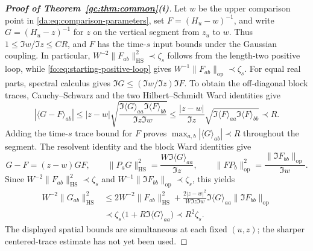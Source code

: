 \documentclass[11pt]{article}
\numberwithin{equation}{section}
\theoremstyle{remark}
\newcommand{\op}{\mathrm{op}}
\newcommand{\HS}{\mathrm{HS}}
\begin{document}
\begin{proof}[\textbf{Proof of Theorem~\ref{gc:thm:common}(i)}]
Let $w$ be the upper comparison point in \eqref{da:eq:comparison-parameters},
set $F=(H_u-w)^{-1}$, and write $G=(H_u-z)^{-1}$ for $z$ on the
vertical segment from $z_u$ to $w$. Thus
$1\le\Im w/\Im z\le CR$, and $F$ has the time-$s$ input bounds
under the Gaussian coupling. In particular,
$W^{-2}\|F_{ab}\|_{\HS}^2\prec\zeta_s$ follows from the length-two
positive loop, while \eqref{fo:eq:starting-positive-loop} gives
$W^{-1}\|F_{ab}\|_{\op}\prec\zeta_s$.
For equal real parts, spectral calculus gives
$\Im G\le(\Im w/\Im z)\Im F$. To obtain the off-diagonal block traces,
Cauchy--Schwarz and the two Hilbert--Schmidt Ward identities give
\[
 |\langle G-F\rangle_{ab}|
 \le |z-w|\sqrt{\frac{\Im\langle G\rangle_{aa}
                              \Im\langle F\rangle_{bb}}
                             {\Im z\Im w}}
 \le\frac{|z-w|}{\Im z}
       \sqrt{\Im\langle F\rangle_{aa}\Im\langle F\rangle_{bb}}
 \prec R.
\]
Adding the time-$s$ trace bound for $F$ proves
$\max_{a,b}|\langle G\rangle_{ab}|\prec R$ throughout the segment.
The resolvent identity and the block Ward identities give
\[
 G-F=(z-w)GF,\qquad
 \|P_aG\|_{\HS}^2=\frac{W\Im\langle G\rangle_{aa}}{\Im z},\qquad
 \|FP_b\|_{\op}^2=\frac{\|\Im F_{bb}\|_{\op}}{\Im w}.
\]
Since $W^{-2}\|F_{ab}\|_{\HS}^2\prec\zeta_s$ and
$W^{-1}\|\Im F_{bb}\|_{\op}\prec\zeta_s$, this yields
\begin{equation}\label{fo:eq:step1-hs-comparison}
 \begin{aligned}
 W^{-2}\|G_{ab}\|_{\HS}^2
 &\le 2W^{-2}\|F_{ab}\|_{\HS}^2
   +\frac{2|z-w|^2}{W\Im z\Im w}
      \Im\langle G\rangle_{aa}\|\Im F_{bb}\|_{\op}\\
 &\prec\zeta_s\bigl(1+R\Im\langle G\rangle_{aa}\bigr)
 \prec R^2\zeta_s.
 \end{aligned}
\end{equation}
The displayed spatial bounds are simultaneous at each fixed $(u,z)$;
the sharper centered-trace estimate has not yet been used.


\end{proof}
\end{document}

